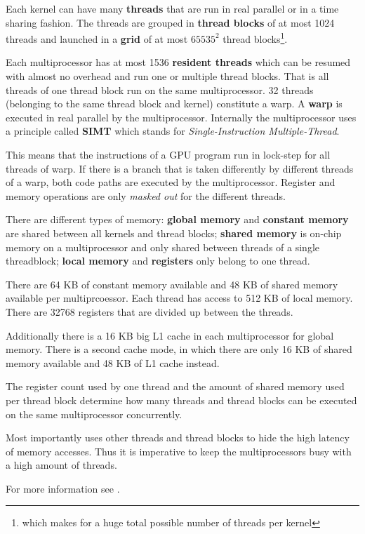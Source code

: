 Each kernel can have many \textbf{threads} that are run in real parallel or in a time sharing fashion. The threads are grouped in \textbf{thread blocks} of at most 1024 threads and launched in a \textbf{grid} of at most $65535^2$ thread blocks\footnote{which makes for a huge total possible number of threads per kernel}.

Each multiprocessor has at most 1536 \textbf{resident threads} which can be resumed with almost no overhead and run one or multiple thread blocks. That is all threads of one thread block run on the same multiprocessor. 32 threads (belonging to the same thread block and kernel) constitute a warp. A \textbf{warp} is executed in real parallel by the multiprocessor. Internally the multiprocessor uses a principle called \textbf{SIMT} which stands for \textit{Single-Instruction Multiple-Thread}.

This means that the instructions of a GPU program run in lock-step for all threads of warp. If there is a branch that is taken differently by different threads of a warp, both code paths are executed by the multiprocessor. Register and memory operations are only \textit{masked out} for the different threads. 

There are different types of memory: \textbf{global memory} and \textbf{constant memory} are shared between all kernels and thread blocks; \textbf{shared memory} is on-chip memory on a multiprocessor and only shared between threads of a single threadblock; \textbf{local memory} and \textbf{registers} only belong to one thread.

There are 64 KB of constant memory available and 48 KB of shared memory available per multiprcoessor. Each thread has access to 512 KB of local memory. There are 32768 registers that are divided up between the threads.

Additionally there is a 16 KB big L1 cache in each multiprocessor for global memory. There is a second cache mode, in which there are only 16 KB of shared memory available and 48 KB of L1 cache instead.

The register count used by one thread and the amount of shared memory used per thread block determine how many threads and thread blocks can be executed on the same multiprocessor concurrently.

Most importantly \cuda{} uses other threads and thread blocks to hide the high latency of memory accesses. Thus it is imperative to keep the multiprocessors busy with a high amount of threads.

For more information see .
